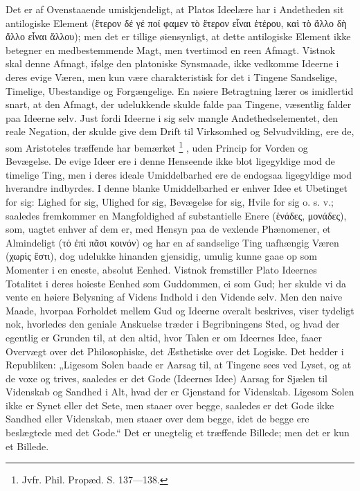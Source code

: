 \documentclass[11pt]{book}
\newcommand{\opage}[1]{\marginnote{\footnotesize\textit{[#1]}}}
\begin{document}
Det er af Ovenstaaende umiskjendeligt, at Platos Ideelære har i
Andetheden sit antilogiske Element (ἕτερον δέ γέ ποί φαμεν τὸ
ἕτερον εἶναι ἑτέρου, καὶ τὸ ἄλλο δὴ ἄλλο εἶναι ἄλλου); men det
er tillige øiensynligt, at dette antilogiske Element ikke betegner
en medbestemmende Magt, men tvertimod en reen Afmagt. Vistnok skal
denne Afmagt, ifølge den platoniske Synsmaade, ikke vedkomme
Ideerne i
\opage{184} \setcounter{footnote}{0}%
deres evige Væren, men kun være charakteristisk for det i Tingene
Sandselige, Timelige, Ubestandige og Forgængelige. En nøiere
Betragtning lærer os imidlertid snart, at den Afmagt, der
udelukkende skulde falde paa Tingene, væsentlig falder paa Ideerne
selv. Just fordi Ideerne i sig selv mangle Andethedselementet, den
reale Negation, der skulde give dem Drift til Virksomhed og
Selvudvikling, ere de, som Aristoteles træffende har bemærket%
\footnote{Jvfr. Phil. Propæd. S. 137---138.}%
, uden Princip for Vorden og Bevægelse. De evige Ideer ere i denne
Henseende ikke blot ligegyldige mod de timelige Ting, men i deres
ideale Umiddelbarhed ere de endogsaa ligegyldige mod hverandre
indbyrdes. I denne blanke Umiddelbarhed er enhver Idee et Ubetinget
for sig: Lighed for sig, Ulighed for sig, Bevægelse for sig, Hvile
for sig o. s. v.; saaledes fremkommer en Mangfoldighed af
substantielle Enere (ἑνάδες, μονάδες), som, uagtet enhver af dem
er, med Hensyn paa de vexlende Phænomener, et Almindeligt (τό ἐπὶ
πᾶσι κοινόν) og har en af sandselige Ting uafhængig Væren (χωρὶς
ἔστι), dog udelukke hinanden gjensidig, umulig kunne gaae op som
Momenter i en eneste, absolut Eenhed. Vistnok fremstiller Plato
Ideernes Totalitet i deres hoieste Eenhed som Guddommen, ei som
Gud; her skulde vi da vente en høiere Belysning af Videns Indhold i
den Vidende selv. Men den naive Maade, hvorpaa Forholdet mellem Gud
og Ideerne overalt beskrives, viser tydeligt nok, hvorledes den
geniale Anskuelse træder i Begribningens Sted, og hvad der egentlig
er Grunden til, at den altid, hvor Talen er om Ideernes Idee, faaer
Overvægt over det Philosophiske, det Æsthetiske over det Logiske.
Det hedder i Republiken: „Ligesom Solen baade er Aarsag til, at
Tingene sees ved Lyset, og at de voxe og trives, saaledes er det
Gode (Ideernes Idee) Aarsag for Sjælen til Videnskab og Sandhed i
Alt, hvad der er Gjenstand for Videnskab. Ligesom Solen ikke er
\opage{185} \setcounter{footnote}{0}%
Synet eller det Sete, men staaer over begge, saaledes er det Gode
ikke Sandhed eller Videnskab, men staaer over dem begge, idet de
begge ere beslægtede med det Gode.“ Det er unegtelig et træffende
Billede; men det er kun et Billede.
\end{document}

